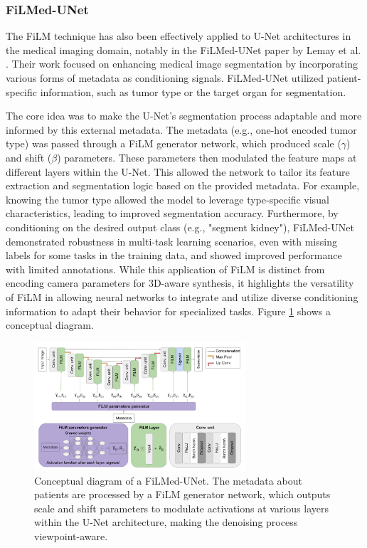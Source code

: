 \subsubsection{FiLMed-UNet}
The FiLM technique has also been effectively applied to U-Net architectures in the medical imaging domain, notably in the FiLMed-UNet paper by Lemay et al. \cite{filmedunet}. Their work focused on enhancing medical image segmentation by incorporating various forms of metadata as conditioning signals. FiLMed-UNet utilized patient-specific information, such as tumor type or the target organ for segmentation.

The core idea was to make the U-Net's segmentation process adaptable and more informed by this external metadata. The metadata (e.g., one-hot encoded tumor type) was passed through a FiLM generator network, which produced scale ($\gamma$) and shift ($\beta$) parameters. These parameters then modulated the feature maps at different layers within the U-Net. This allowed the network to tailor its feature extraction and segmentation logic based on the provided metadata. For example, knowing the tumor type allowed the model to leverage type-specific visual characteristics, leading to improved segmentation accuracy. Furthermore, by conditioning on the desired output class (e.g., "segment kidney"), FiLMed-UNet demonstrated robustness in multi-task learning scenarios, even with missing labels for some tasks in the training data, and showed improved performance with limited annotations. While this application of FiLM is distinct from encoding camera parameters for 3D-aware synthesis, it highlights the versatility of FiLM in allowing neural networks to integrate and utilize diverse conditioning information to adapt their behavior for specialized tasks. Figure \ref{fig:filmed-unet-concept} shows a conceptual diagram.

\begin{figure}[h]
  \centering
  \includegraphics[width=0.7\textwidth]{images/related-work/filmed-unet.png}
  \caption{Conceptual diagram of a FiLMed-UNet. The metadata about patients are processed by a FiLM generator network, which outputs scale and shift parameters to modulate activations at various layers within the U-Net architecture, making the denoising process viewpoint-aware.}
  \label{fig:filmed-unet-concept}

\end{figure}

